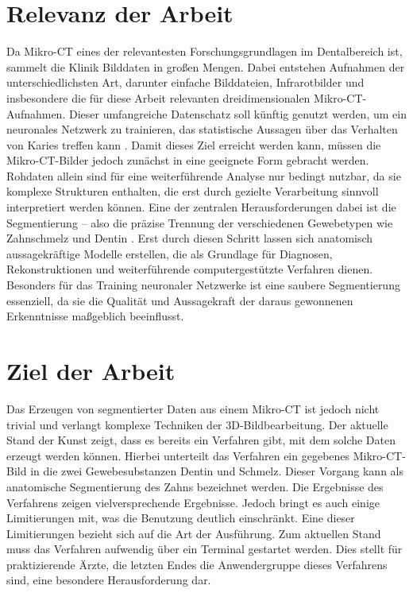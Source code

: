 \section{Relevanz der Arbeit}
\label{sec:relevanz_der_arbeit} Da Mikro-\ac{CT} eines der relevantesten Forschungsgrundlagen
im Dentalbereich ist, sammelt die Klinik Bilddaten in großen Mengen. Dabei entstehen
Aufnahmen der unterschiedlichsten Art, darunter einfache Bilddateien, Infrarotbilder
und insbesondere die für diese Arbeit relevanten dreidimensionalen Mikro-\ac{CT}-Aufnahmen.
Dieser umfangreiche Datenschatz soll künftig genutzt werden, um ein neuronales
Netzwerk zu trainieren, das statistische Aussagen über das Verhalten von Karies treffen
kann \citep[vgl.][S.~1]{walter2025projekt}. Damit dieses Ziel erreicht werden kann,
müssen die Mikro-\ac{CT}-Bilder jedoch zunächst in eine geeignete Form gebracht werden.
Rohdaten allein sind für eine weiterführende Analyse nur bedingt nutzbar, da sie
komplexe Strukturen enthalten, die erst durch gezielte Verarbeitung sinnvoll
interpretiert werden können. Eine der zentralen Herausforderungen dabei ist die Segmentierung
– also die präzise Trennung der verschiedenen Gewebetypen wie Zahnschmelz und Dentin
\citep[vgl.][S.~359]{lehmann2013bildverarbeitung}. Erst durch diesen Schritt lassen
sich anatomisch aussagekräftige Modelle erstellen, die als Grundlage für
Diagnosen, Rekonstruktionen und weiterführende computergestützte Verfahren dienen.
Besonders für das Training neuronaler Netzwerke ist eine saubere Segmentierung
essenziell, da sie die Qualität und Aussagekraft der daraus gewonnenen Erkenntnisse
maßgeblich beeinflusst.

\section{Ziel der Arbeit}
\label{sec:ziel_der_arbeit} Das Erzeugen von segmentierter Daten aus einem Mikro-\ac{CT}
ist jedoch nicht trivial und verlangt komplexe Techniken der 3D-Bildbearbeitung.
Der aktuelle Stand der Kunst zeigt, dass es bereits ein Verfahren gibt, mit dem solche
Daten erzeugt werden können. Hierbei unterteilt das Verfahren ein gegebenes
Mikro-\ac{CT}-Bild in die zwei Gewebesubstanzen Dentin und Schmelz. Dieser
Vorgang kann als anatomische Segmentierung des Zahns bezeichnet werden. Die Ergebnisse
des Verfahrens zeigen vielversprechende Ergebnisse. Jedoch bringt es auch einige
Limitierungen mit, was die Benutzung deutlich einschränkt. Eine dieser
Limitierungen bezieht sich auf die Art der Ausführung. Zum aktuellen Stand muss das
Verfahren aufwendig über ein Terminal gestartet werden. Dies stellt für
praktizierende Ärzte, die letzten Endes die Anwendergruppe dieses Verfahrens sind,
eine besondere Herausforderung dar.

